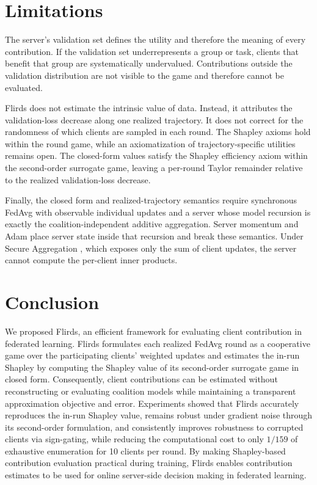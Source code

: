 \documentclass[letterpaper]{article} %
\theoremstyle{definition} %
\begin{document}
\section{Limitations}
\label{sec:limitations}

The server's validation set defines the utility and therefore the meaning of
every contribution. If the validation set underrepresents a group or task,
clients that benefit that group are systematically undervalued. Contributions
outside the validation distribution are not visible to the game and therefore
cannot be evaluated.

Flirds does not estimate the intrinsic value of data. Instead, it attributes
the validation-loss decrease along one realized trajectory. It does not
correct for the randomness of which clients are sampled in each round. The
Shapley axioms hold within the round game, while an axiomatization of
trajectory-specific utilities remains open. The closed-form values satisfy the
Shapley efficiency axiom within the second-order surrogate game, leaving a
per-round Taylor remainder relative to the realized validation-loss decrease.

Finally, the closed form and realized-trajectory semantics require synchronous FedAvg with observable individual updates and a server whose model recursion is exactly the coalition-independent additive aggregation. Server momentum and Adam place server state inside that recursion and break these semantics. Under Secure Aggregation \citep{bonawitz2017practical}, which exposes only the sum of client updates, the server cannot compute the per-client inner products.

\section{Conclusion}
\label{sec:conclusion}

We proposed Flirds, an efficient framework for evaluating client contribution in federated learning. Flirds formulates each realized FedAvg round as a cooperative game over the participating clients' weighted updates and estimates the in-run Shapley by computing the Shapley value of its second-order surrogate game in closed form. Consequently,
client contributions can be estimated without reconstructing or evaluating
coalition models while maintaining a transparent approximation objective and
error. Experiments showed that Flirds accurately reproduces the in-run Shapley value,
remains robust under gradient noise through its second-order formulation, and
consistently improves robustness to corrupted clients via sign-gating, while
reducing the computational cost to only $1/159$ of exhaustive enumeration for
10 clients per round. By making Shapley-based contribution evaluation practical
during training, Flirds enables contribution estimates to be used for
online server-side decision making in federated learning.


\end{document}
